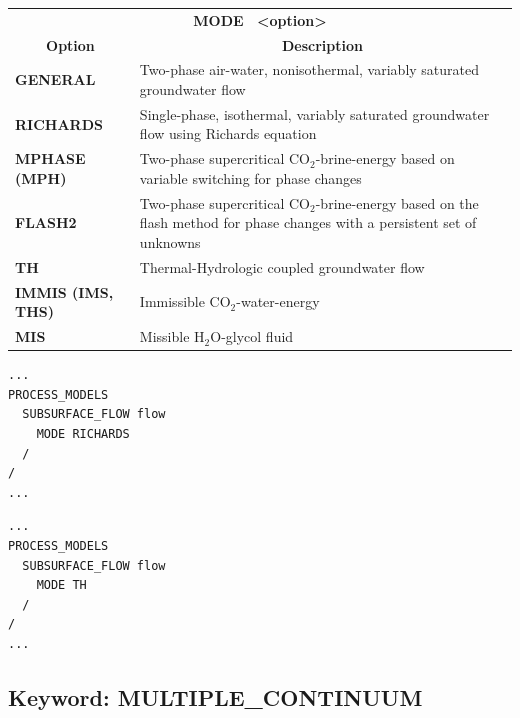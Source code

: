 
\begin{tabularx}{\linewidth}{lX}
\multicolumn{2}{c}{\bf MODE \ <option>}\\
\multicolumn{1}{c}{\bf Option} & \multicolumn{1}{c}{\bf Description}\\
\bf GENERAL & Two-phase air-water, nonisothermal, variably saturated groundwater flow\\
\bf RICHARDS & Single-phase, isothermal, variably saturated groundwater flow using Richards equation\\
\bf MPHASE (MPH) & Two-phase supercritical CO$_2$-brine-energy based on variable switching for phase changes\\
\bf FLASH2 & Two-phase supercritical CO$_2$-brine-energy based on the flash method for phase changes with a persistent set of unknowns\\
\bf TH & Thermal-Hydrologic coupled groundwater flow\\
\bf IMMIS (IMS, THS) & Immissible CO$_2$-water-energy\\
\bf MIS & Missible H$_2$O-glycol fluid\\
\end{tabularx}

\begin{mdframed}
\footnotesize
\begin{verbatim}
...
PROCESS_MODELS
  SUBSURFACE_FLOW flow
    MODE RICHARDS
  /
/
...
\end{verbatim}

\begin{verbatim}
...
PROCESS_MODELS
  SUBSURFACE_FLOW flow
    MODE TH
  /
/
...

\end{verbatim}
\normalsize
\end{mdframed}

\hyperlink{target_key}{\return}


\newpage
\protect\hypertarget{target_mc}{}

\subsection{Keyword: MULTIPLE\_CONTINUUM}

